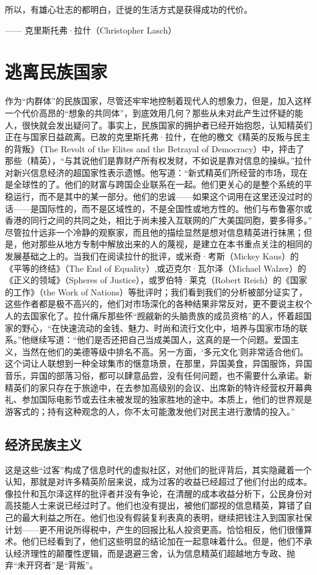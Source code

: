 \begin{tcolorbox}
所以，有雄心壮志的都明白，迁徙的生活方式是获得成功的代价。
\begin{flushright}
—— 克里斯托弗·拉什（Christopher Lasch）
\end{flushright}
\end{tcolorbox}


\section{逃离民族国家}
作为“内群体”的民族国家，尽管还牢牢地控制着现代人的想象力，但是，加入这样一个代价高昂的“想象的共同体”，到底效用几何？那些从未对此产生过怀疑的能人，很快就会发出疑问了。事实上，民族国家的拥护者已经开始抱怨，认知精英们正在与国家日益疏离。已故的克里斯托弗·拉什，在他的檄文《精英的反叛与民主的背叛》（The Revolt of the Elites and the Betrayal of Democracy）中，抨击了那些（精英），“与其说他们是靠财产所有权发财，不如说是靠对信息的操纵。”拉什对新兴信息经济的超国家性表示遗憾。他写道：“新式精英们所经营的市场，现在是全球性的了。他们的财富与跨国企业联系在一起。他们更关心的是整个系统的平稳运行，而不是其中的某一部分。他们的忠诚——如果这个词用在这里还没过时的话——是国际性的，而不是区域性的，不是全国性或地方性的。他们与布鲁塞尔或香港的同行之间的共同之处，相比于尚未接入互联网的广大美国同胞，要多得多。” 尽管拉什远非一个冷静的观察家，而且他的描绘显然是想对信息精英进行抹黑；但是，他对那些从地方专制中解放出来的人的蔑视，是建立在本书重点关注的相同的发展基础之上的。当我们在阅读拉什的批评，或米奇·考斯（Mickey Kaus）的《平等的终结》（The End of Equality）,或迈克尔·瓦尔泽（Michael Walzer）的《正义的领域》（Spheres of Justice），或罗伯特·莱克（Robert Reich）的《国家的工作》（the Work of Nations）等批评时；我们看到我们的分析被部分证实了，这些作者都是极不高兴的，他们对市场深化的各种结果非常反对，更不要说主权个人的去国家化了。拉什痛斥那些怀“觊觎新的头脑贵族的成员资格”的人，怀着超国家的野心，“在快速流动的金钱、魅力、时尚和流行文化中，培养与国家市场的联系。”他继续写道：“他们是否还把自己当成美国人，这真的是一个问题。爱国主义，当然在他们的美德等级中排名不高。另一方面，‘多元文化’则非常适合他们。这个词让人联想到一种全球集市的惬意场景，在那里，异国美食，异国服饰，异国音乐，异国的部落习俗，都可以肆意品尝，没有任何问题，也不需要什么承诺。新精英们的家只存在于旅途中，在去参加高级别的会议、出席新的特许经营权开幕典礼、参加国际电影节或去往未被发现的独家胜地的途中。本质上，他们的世界观是游客式的；持有这种观念的人，你不太可能激发他们对民主进行激情的投入。” 

\subsection{经济民族主义}
这是这些“过客”构成了信息时代的虚拟社区，对他们的批评背后，其实隐藏着一个认知，那就是对许多精英阶层来说，成为过客的收益已经超过了他们付出的成本。像拉什和瓦尔泽这样的批评者并没有争论，在清醒的成本收益分析下，公民身份对高技能人士来说已经过时了。他们也没有提出，被他们鄙视的信息精英，算错了自己的最大利益之所在。他们也没有假装复利表真的表明，继续把钱注入到国家社保计划——更不用说所得税中，产生的回报比私人投资更高。恰恰相反，他们很懂算术。他们已经看到了，他们这些明显的结论加在一起意味着什么。但是，他们不承认经济理性的颠覆性逻辑，而是退避三舍，认为信息精英们超越地方专政、抛弃“未开窍者”是“背叛”。

